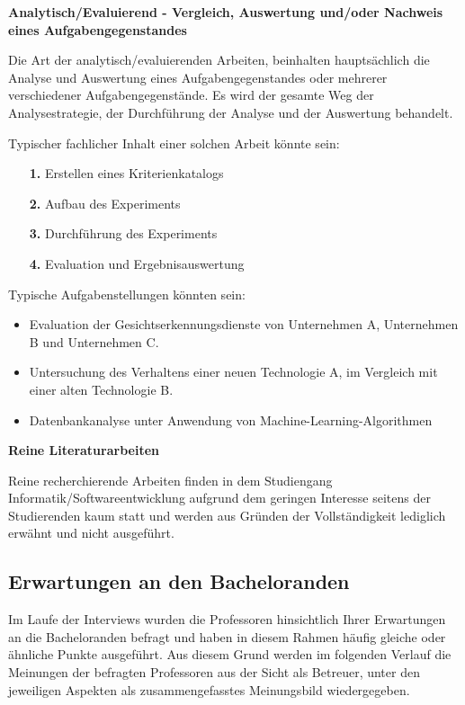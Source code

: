 \documentclass[bibliography=totoc,listof=totoc,BCOR=5mm,DIV=12,oneside]{scrbook}
\begin{document}
\newpage
\par \bigskip \textbf{Analytisch/Evaluierend - Vergleich, Auswertung und/oder Nachweis eines Aufgabengegenstandes}
\par \medskip Die Art der analytisch/evaluierenden Arbeiten, beinhalten hauptsächlich die Analyse und Auswertung eines Aufgabengegenstandes oder mehrerer verschiedener Aufgabengegenstände. Es wird der gesamte Weg der Analysestrategie, der Durchführung der Analyse und der Auswertung behandelt.
\par \medskip Typischer fachlicher Inhalt einer solchen Arbeit könnte sein:
\begin{itemize}
\item[\textbf{1.}] Erstellen eines Kriterienkatalogs
\item[\textbf{2.}] Aufbau des Experiments
\item[\textbf{3.}] Durchführung des Experiments
\item[\textbf{4.}] Evaluation und Ergebnisauswertung
\end{itemize}

\par \medskip Typische Aufgabenstellungen könnten sein:
\begin{itemize}
\item Evaluation der Gesichtserkennungsdienste von Unternehmen A, Unternehmen B und Unternehmen C.
\item Untersuchung des Verhaltens einer neuen Technologie A, im Vergleich mit einer alten Technologie B.
\item Datenbankanalyse unter Anwendung von Machine-Learning-Algorithmen
\end{itemize}

\par \bigskip \textbf{Reine Literaturarbeiten}
\par Reine recherchierende Arbeiten finden in dem Studiengang Informatik/Softwareentwicklung aufgrund dem geringen Interesse seitens der Studierenden kaum statt und werden aus Gründen der Vollständigkeit lediglich erwähnt und nicht ausgeführt.

\newpage
\subsection{Erwartungen an den Bacheloranden}
\par Im Laufe der Interviews wurden die Professoren hinsichtlich Ihrer Erwartungen an die Bacheloranden befragt und haben in diesem Rahmen häufig gleiche oder ähnliche Punkte ausgeführt. Aus diesem Grund werden im folgenden Verlauf die Meinungen der befragten Professoren aus der Sicht als Betreuer, unter den jeweiligen Aspekten als zusammengefasstes Meinungsbild wiedergegeben.
\end{document}
